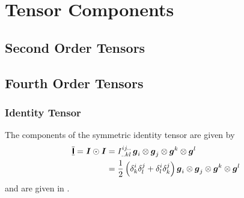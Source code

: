 \chapter{Tensor Components}
\label{app:TensorComponents}

\section{Second Order Tensors}
\label{sec:TensorComponentsSecondOrder}

\section{Fourth Order Tensors}
\label{sec:TensorComponentsFourthOrder}

\subsection{Identity Tensor}
\label{subsec:TensorComponentsFourthOrderIdentity}

The components of the symmetric identity tensor are given by
\begin{align}
    \overline{\underline{\boldsymbol{\mathsf{ I }}}}  =   \boldsymbol{\mathit{ I }}   \odot \boldsymbol{\mathit{  \boldsymbol{\mathit{ I }}  }} &=
   I ^{ij..}_{..kl}\,  \boldsymbol{g} _{i} \otimes  \boldsymbol{g} _{j} \otimes  \boldsymbol{g} ^{k} \otimes  \boldsymbol{g} ^{l} \\ \nonumber
  &=\dfrac{1}{2}\left(   \delta ^{i}_{k}   \delta ^{j}_{l} +  \delta ^{i}_{l}   \delta ^{j}_{k}  \right)  \boldsymbol{g} _{i} \otimes  \boldsymbol{g} _{j} \otimes  \boldsymbol{g} ^{k} \otimes  \boldsymbol{g} ^{l} 
\end{align}
and are given in .

